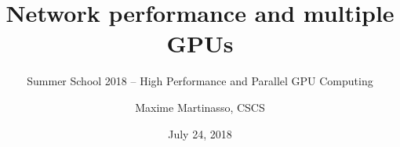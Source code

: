 
\newcommand{\SummerSchoolYear}{2018}
\newcommand{\SummerSchoolDate}{July 24}
\newcommand{\SummerSchoolAuthor}{Maxime Martinasso}

\newcommand{\footlinetext}{Summer School \SummerSchoolYear{} -- Network perf}

\author{\SummerSchoolAuthor, CSCS}
\title{Network performance and multiple GPUs}
\subtitle{Summer School \SummerSchoolYear{}  -- High Performance and Parallel GPU Computing}
\date{\SummerSchoolDate, \SummerSchoolYear}
